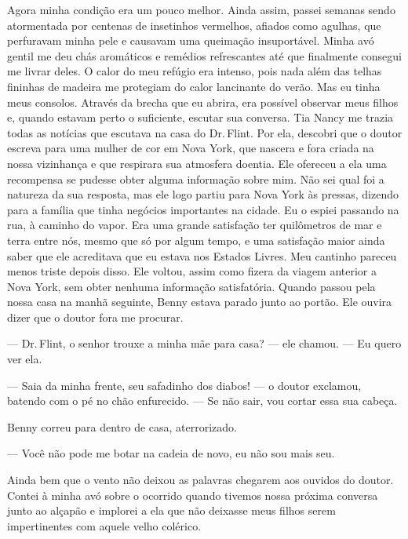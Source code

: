 Agora minha condição era um pouco
melhor. Ainda assim, passei semanas sendo atormentada por centenas de
insetinhos vermelhos, afiados como agulhas, que perfuravam minha pele e
causavam uma queimação insuportável. Minha avó gentil me deu chás
aromáticos e remédios refrescantes até que finalmente consegui me livrar
deles. O calor do meu refúgio era intenso, pois nada além das telhas
fininhas de madeira me protegiam do calor lancinante do verão. Mas eu
tinha meus consolos. Através da brecha que eu abrira, era possível
observar meus filhos e, quando estavam perto o suficiente, escutar sua
conversa. Tia Nancy me trazia todas as notícias que escutava na casa do
Dr.\,Flint. Por ela, descobri que o doutor escreva para uma mulher de cor
em Nova York, que nascera e fora criada na nossa vizinhança e que
respirara sua atmosfera doentia. Ele ofereceu a ela uma recompensa se
pudesse obter alguma informação sobre mim. Não sei qual foi a natureza
da sua resposta, mas ele logo partiu para Nova York às pressas, dizendo
para a família que tinha negócios importantes na cidade. Eu o espiei
passando na rua, à caminho do vapor. Era uma grande satisfação ter
quilômetros de mar e terra entre nós, mesmo que só por algum tempo, e
uma satisfação maior ainda saber que ele acreditava que eu estava nos
Estados Livres. Meu cantinho pareceu menos triste depois disso. Ele
voltou, assim como fizera da viagem anterior a Nova York, sem obter
nenhuma informação satisfatória. Quando passou pela nossa casa na manhã
seguinte, Benny estava parado junto ao portão. Ele ouvira dizer que o
doutor fora me procurar.

--- Dr.\,Flint, o senhor trouxe a minha mãe para casa? --- ele chamou.
--- Eu quero ver ela.

--- Saia da minha frente, seu safadinho dos diabos! --- o doutor
exclamou, batendo com o pé no chão enfurecido. --- Se não sair, vou
cortar essa sua cabeça.

Benny correu para dentro de casa,
aterrorizado.

--- Você não pode me botar na cadeia de novo, eu não sou mais seu.

Ainda bem que o vento não deixou as palavras chegarem aos ouvidos do
doutor. Contei à minha avó sobre o ocorrido quando tivemos nossa próxima
conversa junto ao alçapão e implorei a ela que não deixasse meus filhos
serem impertinentes com aquele velho colérico.

